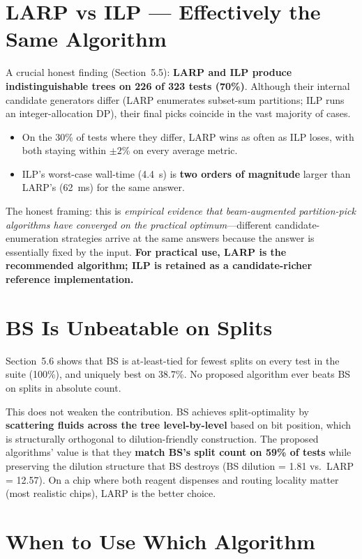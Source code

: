 \section{LARP vs ILP --- Effectively the Same Algorithm}

A crucial honest finding (Section~5.5): \textbf{LARP and ILP produce indistinguishable trees on 226 of 323 tests (70\%)}. Although their internal candidate generators differ (LARP enumerates subset-sum partitions; ILP runs an integer-allocation DP), their final picks coincide in the vast majority of cases.

\begin{itemize}
    \item On the 30\% of tests where they differ, LARP wins as often as ILP loses, with both staying within $\pm 2\%$ on every average metric.
    \item ILP's worst-case wall-time (4.4~s) is \textbf{two orders of magnitude} larger than LARP's (62~ms) for the same answer.
\end{itemize}

The honest framing: this is \textit{empirical evidence that beam-augmented partition-pick algorithms have converged on the practical optimum}---different candidate-enumeration strategies arrive at the same answers because the answer is essentially fixed by the input. \textbf{For practical use, LARP is the recommended algorithm; ILP is retained as a candidate-richer reference implementation.}

\section{BS Is Unbeatable on Splits}

Section~5.6 shows that BS is at-least-tied for fewest splits on every test in the suite (100\%), and uniquely best on 38.7\%. No proposed algorithm ever beats BS on splits in absolute count.

This does not weaken the contribution. BS achieves split-optimality by \textbf{scattering fluids across the tree level-by-level} based on bit position, which is structurally orthogonal to dilution-friendly construction. The proposed algorithms' value is that they \textbf{match BS's split count on 59\% of tests} while preserving the dilution structure that BS destroys (BS dilution = 1.81 vs.\ LARP = 12.57). On a chip where both reagent dispenses and routing locality matter (most realistic chips), LARP is the better choice.

\section{When to Use Which Algorithm}

